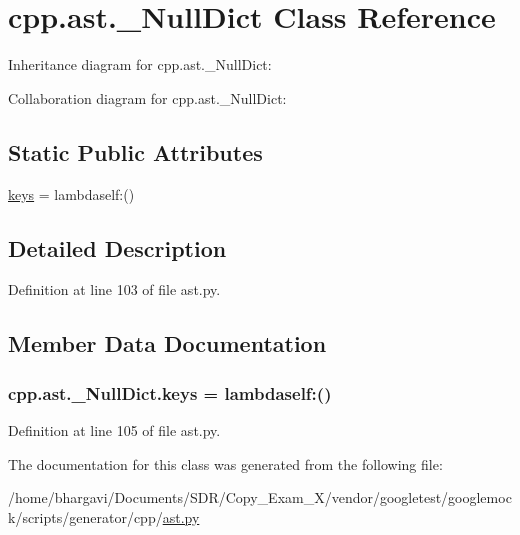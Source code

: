 \hypertarget{classcpp_1_1ast_1_1___null_dict}{}\section{cpp.\+ast.\+\_\+\+Null\+Dict Class Reference}
\label{classcpp_1_1ast_1_1___null_dict}


Inheritance diagram for cpp.\+ast.\+\_\+\+Null\+Dict\+:


Collaboration diagram for cpp.\+ast.\+\_\+\+Null\+Dict\+:
\subsection*{Static Public Attributes}
\begin{DoxyCompactItemize}
\item 
\hyperlink{classcpp_1_1ast_1_1___null_dict_abb0b7884aa59bede0a8503dffcd1733f}{keys} = lambdaself\+:()
\end{DoxyCompactItemize}


\subsection{Detailed Description}


Definition at line 103 of file ast.\+py.



\subsection{Member Data Documentation}
\subsubsection[{\texorpdfstring{keys}{keys}}]{\setlength{\rightskip}{0pt plus 5cm}cpp.\+ast.\+\_\+\+Null\+Dict.\+keys = lambdaself\+:()\hspace{0.3cm}{\ttfamily [static]}}\hypertarget{classcpp_1_1ast_1_1___null_dict_abb0b7884aa59bede0a8503dffcd1733f}{}\label{classcpp_1_1ast_1_1___null_dict_abb0b7884aa59bede0a8503dffcd1733f}


Definition at line 105 of file ast.\+py.



The documentation for this class was generated from the following file\+:\begin{DoxyCompactItemize}
\item 
/home/bhargavi/\+Documents/\+S\+D\+R/\+Copy\+\_\+\+Exam\+\_\+X/vendor/googletest/googlemock/scripts/generator/cpp/\hyperlink{ast_8py}{ast.\+py}\end{DoxyCompactItemize}
